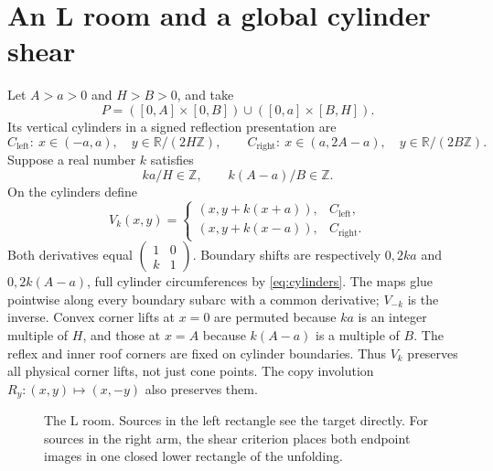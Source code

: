 \documentclass[11pt]{article}
\theoremstyle{definition}
\newcommand{\Z}{\mathbb Z}
\newcommand{\R}{\mathbb R}
\begin{document}
\section{An L room and a global cylinder shear}
Let $A>a>0$ and $H>B>0$, and take
\[
 P=([0,A]\times[0,B])\cup([0,a]\times[B,H]).
\]
Its vertical cylinders in a signed reflection presentation are
\[
 C_{\mathrm{left}}:\ x\in(-a,a),\quad y\in\R/(2H\Z),
 \qquad
 C_{\mathrm{right}}:\ x\in(a,2A-a),\quad y\in\R/(2B\Z).
\]
Suppose a real number $k$ satisfies
\begin{equation}\label{eq:cylinders}
 ka/H\in\Z,\qquad k(A-a)/B\in\Z.
\end{equation}
On the cylinders define
\[
 V_k(x,y)=\begin{cases}
 (x,y+k(x+a)),&C_{\mathrm{left}},\\
 (x,y+k(x-a)),&C_{\mathrm{right}}.
 \end{cases}
\]
Both derivatives equal $\left(\begin{smallmatrix}1&0\\k&1\end{smallmatrix}\right)$. Boundary shifts are respectively $0,2ka$ and $0,2k(A-a)$, full cylinder circumferences by \eqref{eq:cylinders}. The maps glue pointwise along every boundary subarc with a common derivative; $V_{-k}$ is the inverse. Convex corner lifts at $x=0$ are permuted because $ka$ is an integer multiple of $H$, and those at $x=A$ because $k(A-a)$ is a multiple of $B$. The reflex and inner roof corners are fixed on cylinder boundaries. Thus $V_k$ preserves all physical corner lifts, not just cone points. The copy involution $R_y:(x,y)\mapsto(x,-y)$ also preserves them.

\begin{figure}[htbp]\centering
{}
\caption{The L room. Sources in the left rectangle see the target directly. For sources in the right arm, the shear criterion places both endpoint images in one closed lower rectangle of the unfolding.}
\end{figure}
\end{document}
